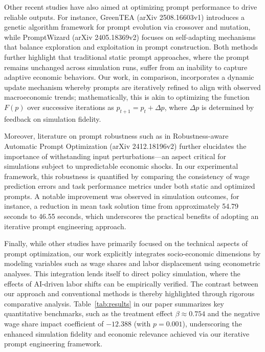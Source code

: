 \documentclass{article}
\begin{document}
Other recent studies have also aimed at optimizing prompt performance to drive reliable outputs. For instance, GreenTEA (arXiv 2508.16603v1) introduces a genetic algorithm framework for prompt evolution via crossover and mutation, while PromptWizard (arXiv 2405.18369v2) focuses on self-adapting mechanisms that balance exploration and exploitation in prompt construction. Both methods further highlight that traditional static prompt approaches, where the prompt remains unchanged across simulation runs, suffer from an inability to capture adaptive economic behaviors. Our work, in comparison, incorporates a dynamic update mechanism whereby prompts are iteratively refined to align with observed macroeconomic trends; mathematically, this is akin to optimizing the function \( F(p) \) over successive iterations as \( p_{t+1} = p_t + \Delta p \), where \( \Delta p \) is determined by feedback on simulation fidelity.

Moreover, literature on prompt robustness such as in Robustness-aware Automatic Prompt Optimization (arXiv 2412.18196v2) further elucidates the importance of withstanding input perturbations—an aspect critical for simulations subject to unpredictable economic shocks. In our experimental framework, this robustness is quantified by comparing the consistency of wage prediction errors and task performance metrics under both static and optimized prompts. A notable improvement was observed in simulation outcomes, for instance, a reduction in mean task solution time from approximately 54.79 seconds to 46.55 seconds, which underscores the practical benefits of adopting an iterative prompt engineering approach.

Finally, while other studies have primarily focused on the technical aspects of prompt optimization, our work explicitly integrates socio-economic dimensions by modeling variables such as wage shares and labor displacement using econometric analyses. This integration lends itself to direct policy simulation, where the effects of AI-driven labor shifts can be empirically verified. The contrast between our approach and conventional methods is thereby highlighted through rigorous comparative analysis. Table~\ref{tab:results} in our paper summarizes key quantitative benchmarks, such as the treatment effect \( \beta \approx 0.754 \) and the negative wage share impact coefficient of \(-12.388\) (with \( p=0.001 \)), underscoring the enhanced simulation fidelity and economic relevance achieved via our iterative prompt engineering framework.
\end{document}
